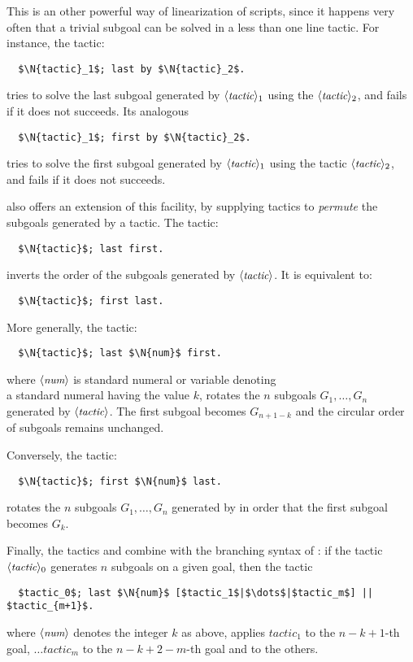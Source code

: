 This is an other powerful way of linearization of scripts, since it
happens very often that a trivial subgoal can be solved in a less than
one line tactic. For instance, the tactic:
\begin{lstlisting}
  $\N{tactic}_1$; last by $\N{tactic}_2$.
\end{lstlisting}
tries to solve the last subgoal generated by $\langle\mbox{\itshape\rmfamily\small tactic}\rangle_1$ using the
$\langle\mbox{\itshape\rmfamily\small tactic}\rangle_2$, and fails if it does not succeeds. Its analogous
\begin{lstlisting}
  $\N{tactic}_1$; first by $\N{tactic}_2$.
\end{lstlisting}
tries to solve the first subgoal generated by $\langle\mbox{\itshape\rmfamily\small tactic}\rangle_1$ using the
tactic $\langle\mbox{\itshape\rmfamily\small tactic}\rangle_2$, and fails if it does not succeeds.


\ssr{} also offers an extension of this facility, by supplying
tactics to \emph{permute}  the subgoals generated by a tactic.
The tactic:
\begin{lstlisting}
  $\N{tactic}$; last first.
\end{lstlisting}
inverts the order of the subgoals generated by $\langle\mbox{\itshape\rmfamily\small tactic}\rangle$. It is
equivalent to:
\begin{lstlisting}
  $\N{tactic}$; first last.
\end{lstlisting}

More generally, the tactic:
\begin{lstlisting}
  $\N{tactic}$; last $\N{num}$ first.
\end{lstlisting}
where $\langle\mbox{\itshape\rmfamily\small num}\rangle$ is
standard \Coq{} numeral or \Ltac{} variable denoting\\
a standard \Coq{} numeral having the value $k$,
rotates the $n$ subgoals $G_1,
\dots, G_n$ generated by $\langle\mbox{\itshape\rmfamily\small tactic}\rangle$. The first subgoal becomes
$G_{n + 1 - k}$ and the circular order of subgoals remains unchanged.

Conversely, the tactic:
\begin{lstlisting}
  $\N{tactic}$; first $\N{num}$ last.
\end{lstlisting}
rotates the $n$ subgoals $G_1,
\dots, G_n$ generated by  in order that the first subgoal
becomes $G_{k}$.

Finally, the tactics  and  combine with the
branching syntax of \Ltac{}:
if the tactic $\langle\mbox{\itshape\rmfamily\small tactic}\rangle_0$ generates $n$
subgoals on a given goal, then the tactic
\begin{lstlisting}
  $tactic_0$; last $\N{num}$ [$tactic_1$|$\dots$|$tactic_m$] || $tactic_{m+1}$.
\end{lstlisting}
where $\langle\mbox{\itshape\rmfamily\small num}\rangle$ denotes the integer $k$ as above, applies $tactic_1$ to the
$n -k + 1$-th goal, $\dots tactic_m$ to the $n -k + 2 - m$-th
goal and  to the others.

